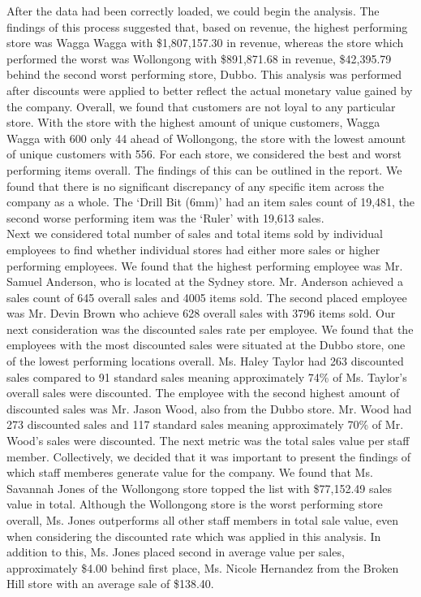 \documentclass{article}
\begin{document}
    After the data had been correctly loaded, we could begin the analysis. The findings of 
    this process suggested that, based on revenue, the highest performing store was Wagga 
    Wagga with \$1,807,157.30 in revenue, whereas the store which performed the worst was 
    Wollongong with \$891,871.68 in revenue, \$42,395.79 behind the second worst performing 
    store, Dubbo. This analysis was performed after discounts were applied to better reflect the 
    actual monetary value gained by the company. Overall, we found that customers are not 
    loyal to any particular store. With the store with the highest amount of unique customers, 
    Wagga Wagga with 600 only 44 ahead of Wollongong, the store with the lowest amount of 
    unique customers with 556. For each store, we considered the best and worst performing 
    items overall. The findings of this can be outlined in the report. We found that there 
    is no significant discrepancy of any specific item across the company as a whole. 
    The `Drill Bit (6mm)' had an item sales count of 19,481, the second worse performing 
    item was the `Ruler' with 19,613 sales. \\
    
    Next we considered total number of sales and total items sold by individual employees 
    to find whether individual stores had either more sales or higher performing employees. 
    We found that the highest performing employee was Mr. Samuel Anderson, who is located 
    at the Sydney store. Mr. Anderson achieved a sales count of 645 overall sales and 4005 
    items sold. The second placed employee was Mr. Devin Brown who achieve 628 overall sales 
    with 3796 items sold. Our next consideration was the discounted sales rate per employee. 
    We found that the employees with the most discounted sales were situated at the Dubbo 
    store, one of the lowest performing locations overall. Ms. Haley Taylor had 263 discounted 
    sales compared to 91 standard sales meaning approximately 74\% of Ms. Taylor's overall 
    sales were discounted. The employee with the second highest amount of discounted sales 
    was Mr. Jason Wood, also from the Dubbo store. Mr. Wood had 273 discounted sales and 
    117 standard sales meaning approximately 70\% of Mr. Wood's sales were discounted.  
    The next metric was the total sales value per staff member. Collectively, we decided 
    that it was important to present the findings of which staff memberes generate value 
    for the company. We found that Ms. Savannah Jones of the Wollongong store topped the 
    list with \$77,152.49 sales value in total. Although the Wollongong store is the worst 
    performing store overall, Ms. Jones outperforms all other staff members in total sale 
    value, even when considering the discounted rate which was applied in this analysis. 
    In addition to this, Ms. Jones placed second in average value per sales, approximately 
    \$4.00 behind first place, Ms. Nicole Hernandez from the Broken Hill store with an 
    average sale of \$138.40. \\
	
\end{document}
